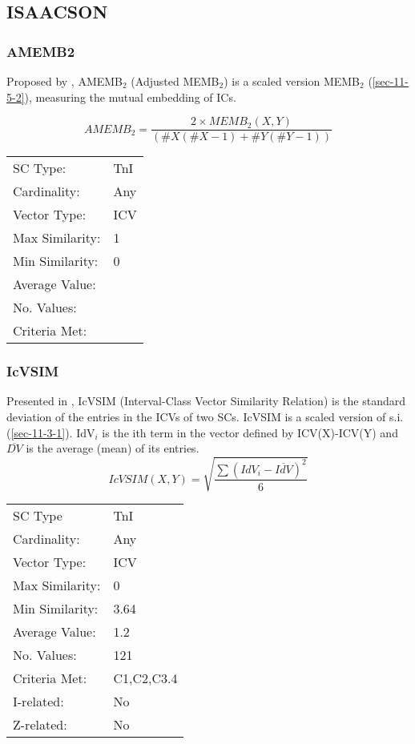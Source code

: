 \documentclass{article}
\begin{document}
\subsection{ISAACSON}
\label{sec-11-6}
\subsubsection{AMEMB2}
\label{sec-11-6-1}

Proposed by \citet[pp. 8]{Isaacson1990}, AMEMB$_{2}$ (Adjusted MEMB$_{2}$)
is a scaled version MEMB$_{2}$ (\ref{sec-11-5-2}), measuring the mutual
embedding of ICs.

$$AMEMB_{2}=\frac{2 \times
MEMB_{2}(X,Y)}{\left(\#X\left(\#X-1\right)+\#Y\left(\#Y-1\right)\right)}$$

\begin{center}
\begin{tabular}{ll}
 SC Type:         &  TnI  \\
 Cardinality:     &  Any  \\
 Vector Type:     &  ICV  \\
 Max Similarity:  &  1    \\
 Min Similarity:  &  0    \\
 Average Value:   &       \\
 No. Values:      &       \\
 Criteria Met:    &       \\
\end{tabular}
\end{center}
\subsubsection{IcVSIM}
\label{sec-11-6-2}

Presented in \citet[pp. 18]{Isaacson1990}, IcVSIM (Interval-Class
Vector Similarity Relation) is the standard deviation of the entries
in the ICVs of two SCs. IcVSIM is a scaled version of
s.i. (\ref{sec-11-3-1}). IdV$_{i}$ is the ith term in the vector defined by
ICV(X)-ICV(Y) and $\overline{DV}$ is the average (mean) of its
entries.
$$IcVSIM(X,Y)=\sqrt{\frac{\sum(IdV_{i}-\overline{IdV})^{2}}{6}}$$

\begin{center}
\begin{tabular}{ll}
 SC Type          &  TnI         \\
 Cardinality:     &  Any         \\
 Vector Type:     &  ICV         \\
 Max Similarity:  &  0           \\
 Min Similarity:  &  3.64        \\
 Average Value:   &  1.2         \\
 No. Values:      &  121         \\
 Criteria Met:    &  C1,C2,C3.4  \\
 I-related:       &  No          \\
 Z-related:       &  No          \\
\end{tabular}
\end{center}
\end{document}
